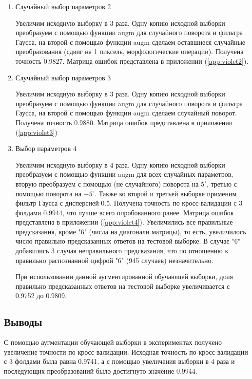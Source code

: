\documentclass{article}
\begin{document}
\begin{itemize}
\begin{enumerate}
        \item Случайный выбор параметров 2
        
        Увеличим исходную выборку в 3 раза. Одну копию исходной выборки преобразуем с помощью функции augm для случайного поворота и фильтра Гаусса, на второй с помощью функции augm сделаем оставшиеся случайные преобразования (сдвиг на 1 пиксель, морфологические операции). Получена точность 0.9827. Матрица ошибок представлена в приложении (\ref{app:violet2}).
        
        \item Случайный выбор параметров 3
        
        Увеличим исходную выборку в 3 раза. Одну копию исходной выборки преобразуем с помощью функции augm для случайного поворота и фильтра Гаусса, на второй с помощью функции augm сделаем случайный поворот. Получена точность 0.9880. Матрица ошибок представлена в приложении (\ref{app:violet3})
        
        \item Выбор параметров 4 \hypertarget{par_ch_4}{}
        
        Увеличим исходную выборку в 4 раза. Одну копию исходной выборки преобразуем с помощью функции augm для всех случайных параметров, вторую преобразуем с помощью (не случайного) поворота на $5^\circ$, третью с помощью поворота на $-5^\circ$. Также ко второй и третьей выборке применим фильтр Гаусса с дисперсией 0.5. Получена точность по кросс-валидации с 3 фолдами 0.9944, что лучше всего опробованного ранее. Матрица ошибок представлена в приложении (\ref{app:violet4}). Увеличились все правильные предсказания, кроме "6"{ }(числа на диагонали матрицы), то есть, увеличилось число правильно предсказанных ответов на тестовой выборке. В случае "6"{ }добавились 3 случая неправильного предсказания, что по отношению к правильно распознанной цифрой "6"{ }(945 случаев) незначительно.
        
        При использовании данной аугментированной обучающей выборки, доля правильно предсказанных ответов на тестовой выборке увеличивается с 0.9752 до 0.9809. 
        
        
   \end{enumerate}
    
\end{itemize}

\subsection{Выводы}
С помощью аугментации обучающей выборки в экспериментах получено увеличение точности по кросс-валидации. Исходная точность по кросс-валидации с 3 фолдами была равна 0.9741, а с помощью увеличения выборки в 4 раза и последующих преобразований было достигнуто значение 0.9944.
\end{document}
